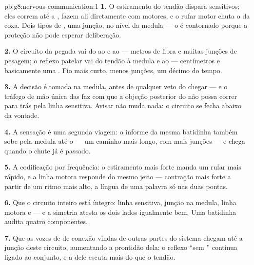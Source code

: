 \begin{solution}{pb:g8:nervous-communication:1}
\textbf{1.} O estiramento do tendão dispara  sensitivos; eles
correm até a \emph{}, fazem  ali diretamente com
 motores, e o rufar motor chuta o  da coxa. Dois tipos
de , uma junção, no nível da medula --- o  é contornado
porque a proteção não pode esperar deliberação.

\textbf{2.} O circuito da pegada vai do  ao  e ao  ---
metros de fibra e muitas junções de pesagem; o reflexo patelar vai do
tendão à medula e ao  --- centímetros e basicamente uma .
Fio mais curto, menos junções, um décimo do tempo.

\textbf{3.} A decisão é tomada na medula, antes de qualquer veto do
 chegar --- e o tráfego de mão única das  faz com que a
objeção posterior do  não possa correr para trás pela linha
sensitiva. Avisar não muda nada: o circuito se fecha abaixo da
vontade.

\textbf{4.} A sensação é uma segunda viagem: o informe da mesma
batidinha também sobe pela medula até o  --- um caminho mais
longo, com mais junções --- e chega quando o chute já é passado.

\textbf{5.} A codificação por frequência: o estiramento mais forte
manda um rufar mais rápido, e a linha motora responde do mesmo jeito
--- contração mais forte a partir de um ritmo mais alto, a língua de uma
palavra só nas duas pontas.

\textbf{6.} Que o circuito inteiro está íntegro: linha sensitiva,
junção na medula, linha motora e  --- e a simetria atesta os
dois lados igualmente bem. Uma batidinha audita quatro componentes.

\textbf{7.} Que as vozes de  de conexão vindas de outras
partes do sistema chegam até a junção deste circuito, aumentando a
prontidão dela: o reflexo ``sem '' continua ligado ao conjunto,
e a  dele escuta mais do que o tendão.


\end{solution}
